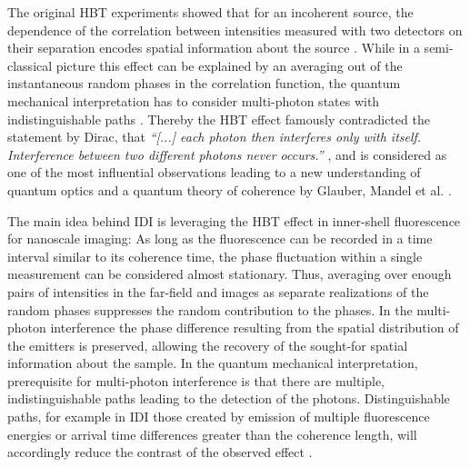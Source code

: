 The original  HBT experiments showed that for an incoherent source, the dependence of the correlation between intensities measured with two detectors on their separation encodes spatial information about the source \cite{baym1997}. While in a semi-classical picture this effect can be explained by an averaging out of the instantaneous random phases in the correlation function, the quantum mechanical interpretation has to consider multi-photon states with indistinguishable paths \cite{fano1961,glauber2006}. Thereby the HBT effect famously contradicted the statement by Dirac, that \textit{\enquote{[...] each photon then interferes only with itself. Interference between two different photons never occurs.}} \cite{dirac1958}, and is considered as one of the most influential observations leading to a new understanding of quantum optics and a quantum theory of coherence by Glauber, Mandel et al. \cite{glauber1963,mandel1959, hong1987}.

The main idea behind IDI is leveraging the HBT effect in inner-shell fluorescence for nanoscale imaging: As long as the fluorescence can be recorded in a time interval similar to its coherence time, the phase fluctuation within a single measurement can be considered almost stationary. Thus, averaging over enough pairs of intensities in the far-field and images as separate realizations of the random phases suppresses the random contribution to the phases.  In the multi-photon interference the phase difference resulting from the spatial distribution of the emitters is preserved,  allowing the recovery of the sought-for spatial information about the sample. In the quantum mechanical interpretation, prerequisite for multi-photon interference is that there are multiple, indistinguishable paths leading to the detection of the photons. Distinguishable paths, for example in IDI those created by emission of multiple fluorescence energies or arrival time differences greater than the coherence length, will accordingly reduce the contrast of the observed effect \cite{classen2017,trost2020,fano1961}. 

